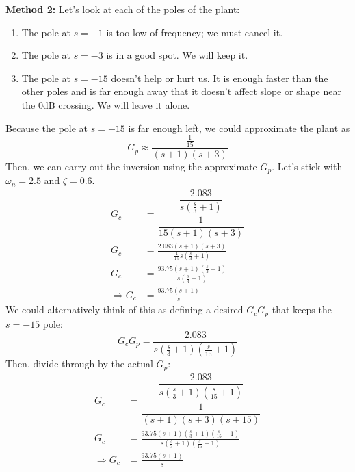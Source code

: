 \documentclass{book}
\begin{document}
\begin{enumerate}
	\textbf{Method 2:} Let’s look at each of the poles of the plant:
	\begin{enumerate}
		\item The pole at $ s=-1 $ is too low of frequency; we must cancel it.
		\item The pole at $ s=-3 $ is in a good spot. We will keep it.
		\item The pole at $ s=-15 $ doesn’t help or hurt us. It is enough faster than the other poles and is far enough away that it doesn’t affect slope or shape near the 0dB crossing. We will leave it alone.
	\end{enumerate}
	Because the pole at $ s=-15 $ is far enough left, we could approximate the plant as
	\begin{equation}
		G_{p} \approx \frac{\frac{1}{15}}{(s+1)(s+3)}
	\end{equation}
	Then, we can carry out the inversion using the approximate $ G_p $. Let's stick with $ \omega_n=2.5 $ and $ \zeta = 0.6 $.
	\begin{align*}
		G_c & = \dfrac{\dfrac{2.083}{s\left(\frac{s}{3}+1\right)}}{\dfrac{1}{15(s+1)(s+3)}}\\
		G_c & = \frac{2.083(s+1)(s+3)}{\frac{1}{15}s\left(\frac{s}{3}+1\right)} \\
		G_c & = \frac{93.75(s+1)\left(\frac{s}{3}+1\right)}{s\left(\frac{s}{3}+1\right)} \\
		\Rightarrow G_c & = \frac{93.75(s+1)}{s}
	\end{align*}
	We could alternatively think of this as defining a desired $ G_cG_p $ that keeps the $ s=-15 $ pole:
	\begin{equation}
		G_cG_p = \frac{2.083}{s\left(\frac{s}{3}+1\right)\left(\frac{s}{15}+1\right)}
	\end{equation}
	Then, divide through by the actual $ G_p $:
	\begin{align*}
		G_c & = \dfrac{\dfrac{2.083}{s\left(\frac{s}{3}+1\right)\left(\frac{s}{15}+1\right)}}{\dfrac{1}{(s+1)(s+3)(s+15)}} \\
		G_c & =  \frac{93.75(s+1)\left(\frac{s}{3}+1\right)\left(\frac{s}{15}+1\right)}{s\left(\frac{s}{3}+1\right)\left(\frac{s}{15}+1\right)} \\
		\Rightarrow G_c & = \frac{93.75(s+1)}{s}
	\end{align*}
	
\end{enumerate}
\end{document}
